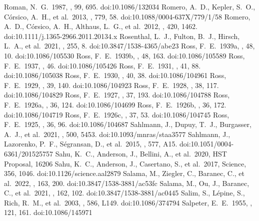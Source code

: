 \documentclass[twocolumn,tighten,twocolappendix]{aastex631}
\begin{document}
\begin{thebibliography}{}
 Roman, N.~G.\ 1987, \pasp, 99, 695. doi:10.1086/132034
 Romero, A.~D., Kepler, S.~O., C{\'o}rsico, A.~H., et al.\ 2013, \apj, 779, 58. doi:10.1088/0004-637X/779/1/58
 Romero, A.~D., C{\'o}rsico, A.~H., Althaus, L.~G., et al.\ 2012, \mnras, 420, 1462. doi:10.1111/j.1365-2966.2011.20134.x
 Rosenthal, L.~J., Fulton, B.~J., Hirsch, L.~A., et al.\ 2021, \apjs, 255, 8. doi:10.3847/1538-4365/abe23
 Ross, F.~E.\ 1939a, \aj, 48, 10. doi:10.1086/105530
 Ross, F.~E.\ 1939b, \aj, 48, 163. doi:10.1086/105589
 Ross, F.~E.\ 1937, \aj, 46. doi:10.1086/105426
 Ross, F.~E.\ 1931, \aj, 41, 88. doi:10.1086/105038
 Ross, F.~E.\ 1930, \aj, 40, 38. doi:10.1086/104961
 Ross, F.~E.\ 1929, \aj, 39, 140. doi:10.1086/104923
 Ross, F.~E.\ 1928, \aj, 38, 117. doi:10.1086/104829
 Ross, F.~E.\ 1927, \aj, 37, 193. doi:10.1086/104788
 Ross, F.~E.\ 1926a, \aj, 36, 124. doi:10.1086/104699
 Ross, F.~E.\ 1926b, \aj, 36, 172. doi:10.1086/104719
 Ross, F.~E.\ 1926c, \aj, 37, 53. doi:10.1086/104745
 Ross, F.~E.\ 1925, \aj, 36, 96. doi:10.1086/104687
 Sahlmann, J., Dupuy, T.~J., Burgasser, A.~J., et al.\ 2021, \mnras, 500, 5453. doi:10.1093/mnras/staa3577
 Sahlmann, J., Lazorenko, P.~F., S{\'e}gransan, D., et al.\ 2015, \aap, 577, A15. doi:10.1051/0004-6361/201525757
 Sahu, K.~C., Anderson, J., Bellini, A., et al.\ 2020, HST Proposal, 16206
 Sahu, K.~C., Anderson, J., Casertano, S., et al.\ 2017, Science, 356, 1046. doi:10.1126/science.aal2879
 Salama, M., Ziegler, C., Baranec, C., et al.\ 2022, \aj, 163, 200. doi:10.3847/1538-3881/ac53fc
 Salama, M., Ou, J., Baranec, C., et al.\ 2021, \aj, 162, 102. doi:10.3847/1538-3881/ac0445
 Salim, S., L{\'e}pine, S., Rich, R.~M., et al.\ 2003, \apjl, 586, L149. doi:10.1086/374794
 Salpeter, E.~E.\ 1955, \apj, 121, 161. doi:10.1086/145971

\end{thebibliography}
\end{document}
